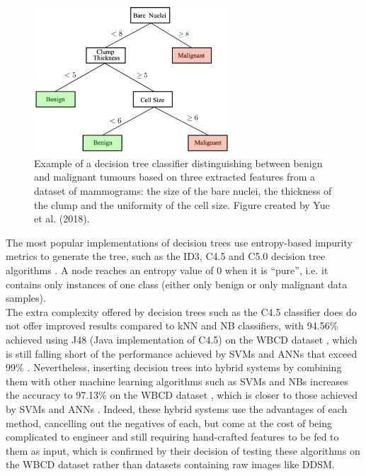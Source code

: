 \begin{figure}[ht]
\centerline{\includegraphics[width=0.65\textwidth]{figures/litsurvey/dt.png}}
\caption{\label{fig:litsurvey-dt-example}Example of a decision tree classifier distinguishing between benign and malignant tumours based on three extracted features from a dataset of mammograms: the size of the bare nuclei, the thickness of the clump and the uniformity of the cell size. Figure created by Yue et al. (2018).}
\end{figure}

The most popular implementations of decision trees use entropy-based impurity metrics to generate the tree, such as the ID3, C4.5 and C5.0 decision tree algorithms \citep{Yue2018}. A node reaches an entropy value of 0 when it is ``pure'', i.e. it contains only instances of one class (either only benign or only malignant data samples).\\

The extra complexity offered by decision trees such as the C4.5 classifier does do not offer improved results compared to kNN and NB classifiers, with 94.56\% achieved using J48 (Java implementation of C4.5) on the WBCD dataset \citep{Sumbaly2014}, which is still falling short of the performance achieved by SVMs and ANNs that exceed 99\% \citep{Yue2018}. Nevertheless, inserting decision trees into hybrid systems by combining them with other machine learning algorithms such as SVMs and NBs increases the accuracy to 97.13\% on the WBCD dataset \citep{Kumar2017}, which is closer to those achieved by SVMs and ANNs \citep{Yue2018}. Indeed, these hybrid systems use the advantages of each method, cancelling out the negatives of each, but come at the cost of being complicated to engineer and still requiring hand-crafted features to be fed to them as input, which is confirmed by their decision of testing these algorithms on the WBCD dataset rather than datasets containing raw images like DDSM.

